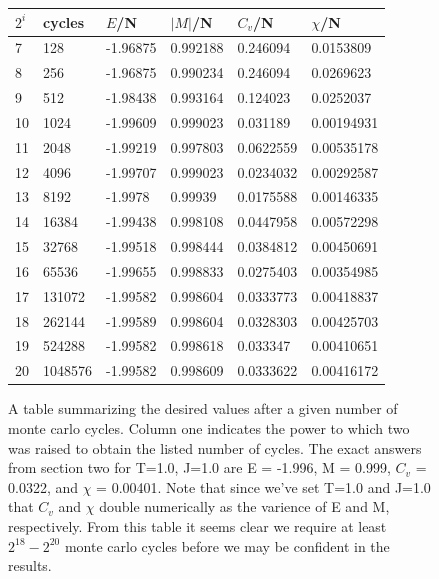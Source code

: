 \documentclass[11pt,a4paper]{article}
\begin{document}
\begin{figure}
\center
\begin{tabular}{| l | l | l | l | l | l |}
\hline
          
$2^i$     &       cycles      &          $E$/N      &    $|M|$/N   &    $C_v$/N      &     $\chi$/N	\\ \hline
7       &     128     &  	  -1.96875  &    0.992188   &   0.246094  &    0.0153809 \\ \hline
8       &     256     &     -1.96875  &   0.990234     & 0.246094    &  0.0269623 \\ \hline
 9      &      512     &      -1.98438   &   0.993164    & 0.124023    &  0.0252037\\ \hline
10     &      1024     &       -1.99609   &   0.999023    & 0.031189    & 0.00194931\\ \hline
11     &      2048     &  -1.99219   &   0.997803   &  0.0622559   &  0.00535178\\ \hline
 12     &      4096     &      -1.99707   &   0.999023   &  0.0234032   &  0.00292587\\ \hline
13    &       8192     &      -1.9978    &   0.99939    &  0.0175588   &  0.00146335\\ \hline
14    &      16384     &      -1.99438   &   0.998108   &  0.0447958   &  0.00572298\\ \hline
15    &      32768     &      -1.99518   &   0.998444   &  0.0384812   &  0.00450691\\ \hline
16   &       65536     &      -1.99655     &   0.998833   &   0.0275403  &   0.00354985\\ \hline
 17   &      131072     &         -1.99582   &   0.998604   & 0.0333773    & 0.00418837\\ \hline
 18   &      262144     &       -1.99589   &     0.998604 &    0.0328303 &    0.00425703\\ \hline
19   &      524288     &      -1.99582   &    0.998618  &     0.033347 &    0.00410651\\ \hline
20   &     1048576     &      -1.99582     & 0.998609    & 0.0333622     &0.00416172\\ \hline
\end{tabular}
\caption{A table summarizing the desired values after a given number of monte carlo cycles. Column one indicates the power to which two was raised to obtain the listed number of cycles. The exact answers from section two for T=1.0, J=1.0 are E = -1.996, M = 0.999, $C_v$ = 0.0322, and $\chi$ = 0.00401. Note that since we've set T=1.0 and J=1.0 that $C_v$ and $\chi$ double numerically as the varience of E and M, respectively. From this table it seems clear we require at least $2^{18}-2^{20}$ monte carlo cycles before we may be confident in the results.}
\end{figure}
\end{document}
